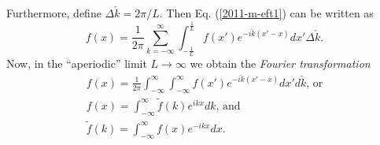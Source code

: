 Furthermore, define
$\Delta \check{k} = 2\pi /L$.
Then Eq. (\ref{2011-m-eft1}) can be written as
\begin{equation}
f(x)= \frac{1}{2\pi}
\sum _{k=-\infty}^\infty  \int_{-\frac{1}{L}}^\frac{1}{L} f(x') e^{-i{\check{k}(x'-x)}} dx' \Delta \check{k}
.
\end{equation}
Now,
in the ``aperiodic'' limit $L\rightarrow \infty$ we obtain  the {\em Fourier transformation}
\begin{equation}
\begin{array}{l}
f(x)= \frac{1}{2\pi}
 \int_{-\infty}^\infty   \int_{-\infty}^\infty f(x') e^{-i{\check{k}(x'-x)}} dx' d\check{k} \textrm{, or} \\
 f(x)=  \int_{-\infty}^\infty \tilde{f}(k) e^{i{kx}} dk \textrm{, and} \\
 \tilde{f}(k)=   \int_{-\infty}^\infty  f(x) e^{-i{kx}} dx
.
\end{array}
\label{2011-m-eft}
\end{equation}


